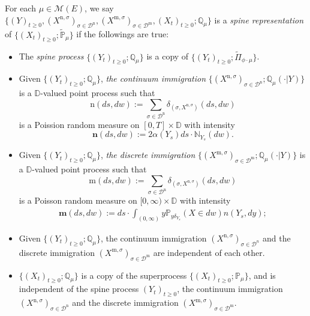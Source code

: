\documentclass[12pt,a4paper]{amsart}
\numberwithin{equation}{section}
\theoremstyle{plain}
\theoremstyle{definition}
\begin{document}
For each $\mu \in \mathcal M(E)$, we say $\{(Y)_{t\geq 0}, (X^{\mathrm n,
  \sigma})_{\sigma\in \mathcal D^\mathrm n}, (X^{\mathrm m, \sigma})_{\sigma \in
  \mathcal D^\mathrm m}, (X_t)_{t\geq 0}; \mathbb Q_{\mu}\}$ is a \emph{spine representation} of $\{(X_t)_{t\geq 0}; \widetilde {\mathbb P}_\mu\}$ if the followings are true:
\begin{itemize}
\item
  The \emph{spine process} $\{(Y_t)_{t\geq 0}; \mathbb Q_\mu\}$ is a copy of
  $\{(Y_t)_{t\geq 0}; \widetilde \Pi_{\phi\cdot\mu}\}$.
\item
  Given $\{(Y_t)_{t\geq 0}; \mathbb Q_\mu\}$, \emph{the continuum immigration} $\{ (X^{\mathrm n,\sigma})_{\sigma \in \mathcal D^\mathrm n};
  \mathbb Q_\mu(\cdot |Y)\}$ is a $\mathbb D$-valued point process such that
  \[
    \mathrm n(ds,dw) := \sum_{\sigma\in \mathcal D^{\mathrm n}} \delta_{(\sigma, X^{\mathrm n,\sigma})}(ds,dw)
  \]
  is a Poission random measure on $[0,T]\times \mathbb D$ with intensity
  \[
    \mathbf n(ds,dw):= 2 \alpha(Y_s) ds \cdot \mathbb N_{Y_s}(dw).
  \]
\item
  Given $\{(Y_t)_{t\geq 0}; \mathbb Q_\mu\}$, \emph{the discrete immigration} $\{(X^{\mathrm m,\sigma})_{\sigma\in \mathcal D^{\mathrm m}};
  \mathbb Q_\mu(\cdot |Y)\}$ is a $\mathbb D$-valued point process such that
  \[
    \mathrm m(ds,dw) := \sum_{\sigma\in \mathcal D^{\mathrm n}} \delta_{(\sigma, X^{\mathrm n,\sigma})}(ds,dw)
  \]
  is a Poisson random measure on $[0,\infty ) \times \mathbb D$ with intensity
  \begin{align}\label{eq:meanMeasImmigr}
    \mathbf m(ds,dw):= ds \cdot \int_{(0,\infty)} y \mathbb P_{y\delta_{Y_s}}(X\in dw) n(Y_s,dy);
  \end{align}
\item
  Given $\{(Y_t)_{t\geq 0}; \mathbb Q_\mu\}$, the continuum immigration $(X^{\mathrm n,\sigma})_{\sigma \in \mathcal D^n}$ and the discrete immigration $(X^{\mathrm m,\sigma})_{\sigma\in \mathcal D^{\mathrm m}}$ are independent of each other.
\item
	$\{(X_t)_{t\geq 0}; \mathbb Q_\mu\}$ is a copy of the superprocess $\{(X_t)_{t\geq 0}; \mathbb P_\mu\}$, and is independent of the spine process $(Y_t)_{t\geq 0}$, the continuum immigration $(X^{\mathrm n,\sigma})_{\sigma
    \in \mathcal D^\mathrm n}$ and the discrete immigration $(X^{\mathrm
    m,\sigma})_{\sigma\in \mathcal D^{\mathrm m}}$.
\end{itemize}
\end{document}
